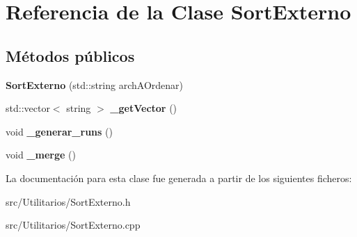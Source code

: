 \hypertarget{class_sort_externo}{\section{\-Referencia de la \-Clase \-Sort\-Externo}
\label{class_sort_externo}
}
\subsection*{\-Métodos públicos}
\begin{DoxyCompactItemize}
\item 
\hypertarget{class_sort_externo_a98481688a1e3da8a006e1747fa5ba93c}{{\bfseries \-Sort\-Externo} (std\-::string arch\-A\-Ordenar)}\label{class_sort_externo_a98481688a1e3da8a006e1747fa5ba93c}

\item 
\hypertarget{class_sort_externo_a5a1d1a56a57106308d3f59efc087e89f}{std\-::vector$<$ string $>$ {\bfseries \-\_\-get\-Vector} ()}\label{class_sort_externo_a5a1d1a56a57106308d3f59efc087e89f}

\item 
\hypertarget{class_sort_externo_ac26a4a3e07c0932037d9a4de6307031d}{void {\bfseries \-\_\-generar\-\_\-runs} ()}\label{class_sort_externo_ac26a4a3e07c0932037d9a4de6307031d}

\item 
\hypertarget{class_sort_externo_a95964bf45e56cbc1b027a0ae467fec74}{void {\bfseries \-\_\-merge} ()}\label{class_sort_externo_a95964bf45e56cbc1b027a0ae467fec74}

\end{DoxyCompactItemize}


\-La documentación para esta clase fue generada a partir de los siguientes ficheros\-:\begin{DoxyCompactItemize}
\item 
src/\-Utilitarios/\-Sort\-Externo.\-h\item 
src/\-Utilitarios/\-Sort\-Externo.\-cpp\end{DoxyCompactItemize}

